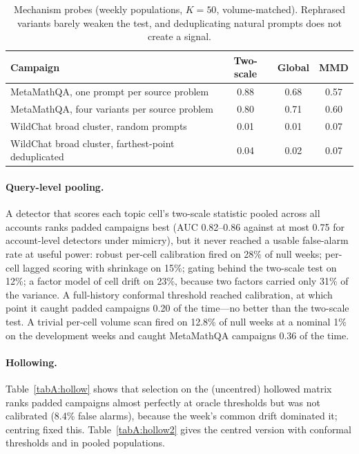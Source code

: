 \begin{table}[h]
\centering
\caption{Mechanism probes (weekly populations, $K=50$, volume-matched). Rephrased variants barely weaken the test, and deduplicating natural prompts does not create a signal.}
\label{tabA:mech}
\small
\begin{tabular}{lccc}
\toprule
Campaign & Two-scale & Global & MMD \\
\midrule
MetaMathQA, one prompt per source problem & 0.88 & 0.68 & 0.57 \\
MetaMathQA, four variants per source problem & 0.80 & 0.71 & 0.60 \\
WildChat broad cluster, random prompts & 0.01 & 0.01 & 0.07 \\
WildChat broad cluster, farthest-point deduplicated & 0.04 & 0.02 & 0.07 \\
\bottomrule
\end{tabular}
\end{table}

\paragraph{Query-level pooling.} A detector that scores each topic cell's two-scale statistic pooled across all accounts ranks padded campaigns best (AUC 0.82--0.86 against at most 0.75 for account-level detectors under mimicry), but it never reached a usable false-alarm rate at useful power: robust per-cell calibration fired on 28\% of null weeks; per-cell lagged scoring with shrinkage on 15\%; gating behind the two-scale test on 12\%; a factor model of cell drift on 23\%, because two factors carried only 31\% of the variance. A full-history conformal threshold reached calibration, at which point it caught padded campaigns 0.20 of the time---no better than the two-scale test. A trivial per-cell volume scan fired on 12.8\% of null weeks at a nominal 1\% on the development weeks and caught MetaMathQA campaigns 0.36 of the time.

\paragraph{Hollowing.} Table~\ref{tabA:hollow} shows that selection on the (uncentred) hollowed matrix ranks padded campaigns almost perfectly at oracle thresholds but was not calibrated (8.4\% false alarms), because the week's common drift dominated it; centring fixed this. Table~\ref{tabA:hollow2} gives the centred version with conformal thresholds and in pooled populations.

